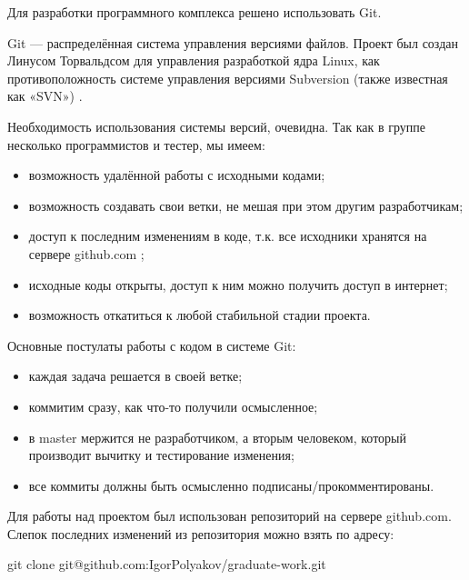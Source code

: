 Для разработки программного комплекса решено использовать Git.

Git  — распределённая система управления версиями файлов. Проект был создан Линусом Торвальдсом для управления разработкой ядра Linux, как противоположность системе управления версиями Subversion (также известная как «SVN») \cite{progit}.

Необходимость использования системы версий, очевидна. Так как в группе несколько программистов и тестер, мы имеем:
\begin{itemize}
\item возможность удалённой работы с исходными кодами;
\item возможность создавать свои ветки, не мешая при этом другим разработчикам;
\item доступ к последним изменениям в коде, т.к. все исходники хранятся на сервере github.com ;
\item исходные коды открыты, доступ к ним можно получить доступ в интернет;
\item возможность откатиться к любой стабильной стадии проекта.
\end{itemize}

Основные постулаты работы с кодом в системе Git:

\begin{itemize}
\item каждая задача решается в своей ветке;
\item коммитим сразу, как что-то получили осмысленное;
\item в master мержится не разработчиком, а вторым человеком, который производит вычитку и тестирование изменения;
\item все коммиты должны быть осмысленно подписаны/прокомментированы.
\end{itemize}

Для работы над проектом был использован репозиторий на сервере github.com. Слепок последних изменений из репозитория можно взять по адресу:

git clone git@github.com:IgorPolyakov/graduate-work.git
